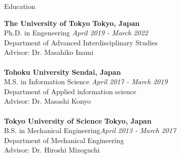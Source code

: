 \documentclass{resume} %
\begin{document}




\begin{rSection}{Education}

{\bf The University of Tokyo} \hfill {\bf Tokyo, Japan} 
\\ Ph.D. in Engeneering \hfill {\em April 2019 - March 2022} 
\\ Department of Advanced Interdisciplinary Studies
\\ Advisor: Dr. Masahiko Inami\\
\vspace{-3mm}
\\ {\bf Tohoku University} \hfill {\bf Sendai, Japan} 
\\ M.S. in Information Science \hfill {\em April 2017 - March 2019}
\\ Department of Applied information science
\\ Advisor: Dr. Masashi Konyo\\
\vspace{-3mm}
\\{\bf Tokyo University of Science} \hfill {\bf Tokyo, Japan} 
\\ B.S. in Mechanical Engineering\hfill {\em April 2013 - March 2017} 
\\ Department of Mechanical Engineering
\\ Advisor: Dr. Hiroshi Mizoguchi\\


\end{rSection}
\end{document}
